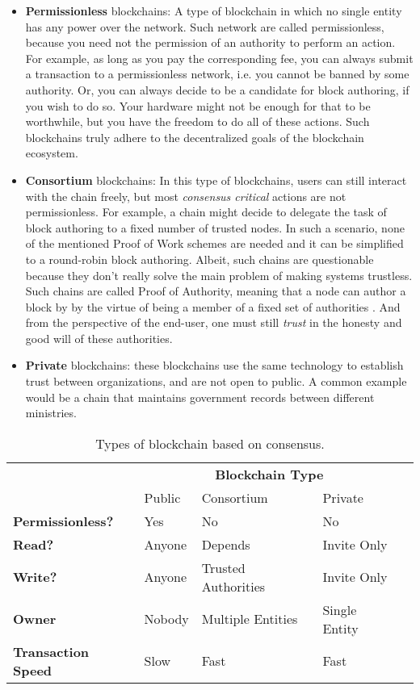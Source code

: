 \begin{itemize}
	\item \textbf{Permissionless} blockchains: A type of blockchain in which no single entity has
	any power over the network. Such network are called permissionless, because you need not the
	permission of an authority to perform an action. For example, as long as you pay the
	corresponding fee, you can always submit a transaction to a permissionless network, i.e. you
	cannot be banned by some authority. Or, you can always decide to be a candidate for block
	authoring, if you wish to do so. Your hardware might not be enough for that to be worthwhile,
	but you have the freedom to do all of these actions. Such blockchains truly adhere to the
	decentralized goals of the blockchain ecosystem.
	\item \textbf{Consortium} blockchains: In this type of blockchains, users can still interact
	with the chain freely, but most \textit{consensus critical} actions are not permissionless. For
	example, a chain might decide to delegate the task of block authoring to a fixed number of
	trusted nodes. In such a scenario, none of the mentioned Proof of Work schemes are needed and it
	can be simplified to a round-robin block authoring. Albeit, such chains are questionable because
	they don't really solve the main problem of making systems trustless. Such chains are called
	Proof of Authority, meaning that a node can author a block by by the virtue of being a member of
	a fixed set of authorities \cite{deangelisPBFTVsProofofauthority2018}. And from the perspective
	of the end-user, one must still \textit{trust} in the honesty and good will of these
	authorities.
	\item \textbf{Private} blockchains: these blockchains use the same technology to establish trust
	between organizations, and are not open to public. A common example would be a chain that
	maintains government records between different ministries.
\end{itemize}

\begin{table}[]
	\caption{Types of blockchain based on consensus.}
	\label{table:blockchain_types}
	\begin{tabular}{lllll}
													& \multicolumn{3}{c}{\textbf{Blockchain Type}} &
													\\
													& Public & Consortium          & Private       &
	\\ \cline{1-4} \multicolumn{1}{l|}{\textbf{Permissionless?}}   & Yes    & No                  &
	No            &  \\
	\multicolumn{1}{l|}{\textbf{Read?}}             & Anyone & Depends             & Invite Only   &
	\\
	\multicolumn{1}{l|}{\textbf{Write?}}            & Anyone & Trusted Authorities & Invite Only   &
	\\
	\multicolumn{1}{l|}{\textbf{Owner}}             & Nobody & Multiple Entities   & Single Entity &
	\\
	\multicolumn{1}{l|}{\textbf{Transaction Speed}} & Slow   & Fast                & Fast          &
	\end{tabular}
\end{table}


